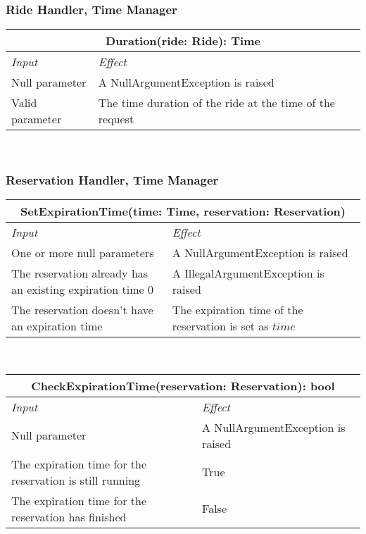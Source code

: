 		\subsubsection*{Ride Handler, Time Manager}
			\begin{tabular}{ |l|l| }
				\hline
				\multicolumn{2}{|c|}{Duration(ride: Ride): Time}\\
				\hline
				\textit{Input} & \textit{Effect}\\ \hline
				Null parameter & A NullArgumentException is raised\\ \hline
				Valid parameter & The time duration of the ride at the time of the request\\ \hline
			\end{tabular}
			\\
		
		
		
		\subsubsection*{Reservation Handler, Time Manager}
			\begin{tabular}{ |l|l| }
				\hline
				\multicolumn{2}{|c|}{SetExpirationTime(time: Time, reservation: Reservation)}\\
				\hline
				\textit{Input} & \textit{Effect}\\ \hline
				One or more null parameters & A NullArgumentException is raised\\ \hline
				The reservation already has an existing expiration time 0& A IllegalArgumentException is raised \\ \hline %
				The reservation doesn't have an expiration time & The expiration time of the reservation is set as $time$\\ \hline
			\end{tabular}
			\\
			\begin{tabular}{ |l|l| }
				\hline
				\multicolumn{2}{|c|}{CheckExpirationTime(reservation: Reservation): bool}\\
				\hline
				\textit{Input} & \textit{Effect}\\ \hline
				Null parameter & A NullArgumentException is raised\\ \hline
				The expiration time for the reservation is still running & True\\ \hline
				The expiration time for the reservation has finished & False\\ \hline
			\end{tabular}
			\\
		

